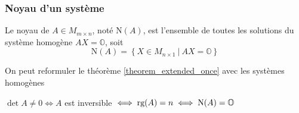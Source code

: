 \subsubsection{Noyau d'un système}
\begin{definition}
    Le noyau de $A \in M_{m \times n}$, noté $\text{N}(A)$, est l'ensemble de toutes les solutions du système homogène
    $AX = \mathbb{O}$, soit 
    \[ \text{N}(A) = \left\{ X \in M_{n \times 1} \ | \ AX = \mathbb{O}  \right\} \]
\end{definition}
On peut reformuler le théorème \ref{theorem_extended_once} avec les systèmes homogènes
\begin{theorem}
    \label{inversible_rank_kernel_thm}
    $\det A \neq 0 \iff A $ est inversible $\iff \textup{rg}(A) = n \iff \textup{N}(A) = \mathbb{O} $
\end{theorem}